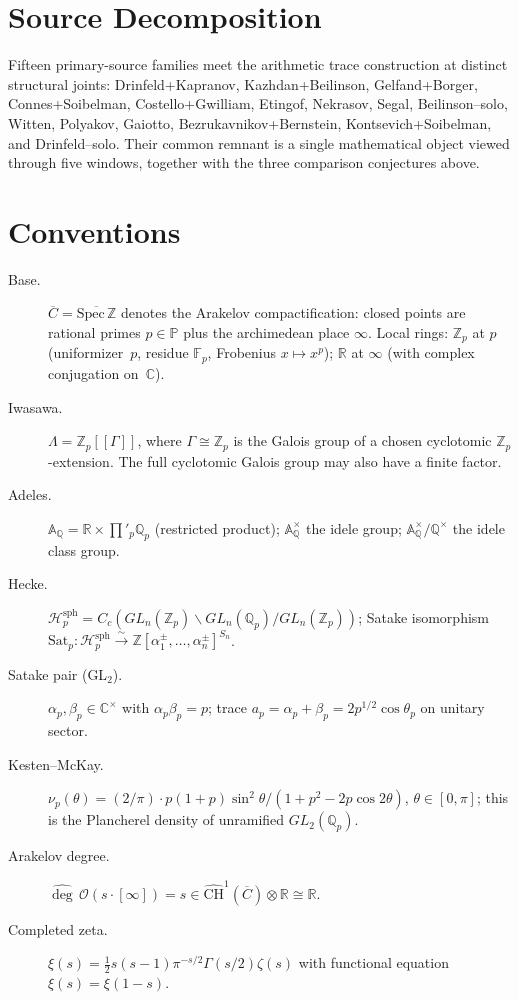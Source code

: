 \section{Source Decomposition}
\label{v4-arith:manifesto:provenance}

Fifteen primary-source families meet the arithmetic trace construction
at distinct structural joints:
Drinfeld+Kapranov, Kazhdan+Beilinson, Gelfand+Borger,
Connes+Soibelman, Costello+Gwilliam, Etingof, Nekrasov, Segal,
Beilinson--solo, Witten, Polyakov, Gaiotto,
Bezrukavnikov+Bernstein, Kontsevich+Soibelman, and Drinfeld--solo.
Their common remnant is a single mathematical object viewed through
five windows, together with the three comparison conjectures above.

\section{Conventions}
\label{v4-arith:manifesto:conventions}

\begin{description}
\item[Base.] \(\overline{C}=\overline{\mathrm{Spec}\,\mathbb{Z}}\)
denotes the Arakelov compactification: closed points are rational
primes \(p\in\mathbb{P}\) plus the archimedean place \(\infty\). Local
rings: \(\mathbb{Z}_{p}\) at \(p\) (uniformizer~\(p\), residue
\(\mathbb{F}_{p}\), Frobenius \(x\mapsto x^{p}\)); \(\mathbb{R}\) at
\(\infty\) (with complex conjugation on~\(\mathbb{C}\)).
\item[Iwasawa.] \(\Lambda=\mathbb Z_p[[\Gamma]]\), where
\(\Gamma\cong\mathbb Z_p\) is the Galois group of a chosen
cyclotomic \(\mathbb Z_p\)-extension. The full cyclotomic
Galois group may also have a finite factor.
\item[Adeles.] \(\mathbb{A}_{\mathbb{Q}}=\mathbb{R}\times\prod'_{p}\mathbb{Q}_{p}\)
(restricted product); \(\mathbb{A}_{\mathbb{Q}}^{\times}\) the idele
group; \(\mathbb{A}_{\mathbb{Q}}^{\times}/\mathbb{Q}^{\times}\) the
idele class group.
\item[Hecke.] \(\mathcal{H}_{p}^{\mathrm{sph}}=C_{c}(GL_{n}(\mathbb{Z}_{p})\backslash GL_{n}(\mathbb{Q}_{p})/GL_{n}(\mathbb{Z}_{p}))\);
Satake isomorphism
\(\mathrm{Sat}_{p}:\mathcal{H}_{p}^{\mathrm{sph}}\xrightarrow{\sim}
\mathbb{Z}[\alpha_{1}^{\pm},\dots,\alpha_{n}^{\pm}]^{S_{n}}\).
\item[Satake pair (GL\({}_{2}\)).] \(\alpha_{p},\beta_{p}\in\mathbb{C}^{\times}\)
with \(\alpha_{p}\beta_{p}=p\); trace
\(a_{p}=\alpha_{p}+\beta_{p}=2p^{1/2}\cos\theta_{p}\) on unitary
sector.
\item[Kesten--McKay.] \(\nu_{p}(\theta)=(2/\pi)\cdot p(1+p)\sin^{2}\theta/(1+p^{2}-2p\cos 2\theta)\),
\(\theta\in[0,\pi]\); this is the Plancherel density of unramified
\(GL_{2}(\mathbb{Q}_{p})\).
\item[Arakelov degree.] \(\widehat{\deg}\,\mathcal{O}(s\cdot[\infty])=s\in\widehat{\mathrm{CH}}^{1}(\overline{C})\otimes\mathbb{R}\cong\mathbb{R}\).
\item[Completed zeta.] \(\xi(s)=\tfrac{1}{2}s(s-1)\pi^{-s/2}\Gamma(s/2)\zeta(s)\)
with functional equation \(\xi(s)=\xi(1-s)\).
\end{description}

